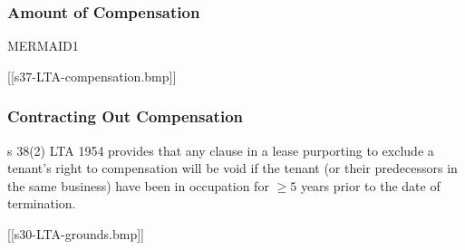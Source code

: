 \documentclass[
]{article}
\begin{document}
\hypertarget{amount-of-compensation}{%
\subsubsection{Amount of Compensation}\label{amount-of-compensation}}

MERMAID1

{[}{[}s37-LTA-compensation.bmp{]}{]}

\hypertarget{contracting-out-compensation}{%
\subsubsection{Contracting Out
Compensation}\label{contracting-out-compensation}}

s 38(2) LTA 1954 provides that any clause in a lease purporting to
exclude a tenant's right to compensation will be void if the tenant (or
their predecessors in the same business) have been in occupation for
\(\geq 5\) years prior to the date of termination.

{[}{[}s30-LTA-grounds.bmp{]}{]}
\end{document}
